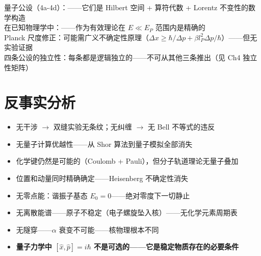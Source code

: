\precisionbox[R4 精度等级]
  量子公设（4a-4d）：\precexact ——它们是 Hilbert 空间 + 算符代数 + Lorentz 不变性的数学构造\\
  在已知物理学中：\preceffective ——作为有效理论在 $E \ll E_P$ 范围内是精确的\\
  Planck 尺度修正：可能需广义不确定性原理（$\Delta x \ge \hbar/\Delta p + \beta l_P^2 \Delta p/\hbar$）——但无实验证据\\
  四条公设的独立性：每条都是逻辑独立的——不可从其他三条推出（见 Ch4 独立性矩阵）
\endprecisionbox

\section*{反事实分析}

\begin{limitbox}
  \begin{itemize}
    \item 无干涉 $\to$ 双缝实验无条纹；无纠缠 $\to$ 无 Bell 不等式的违反
    \item 无量子计算优越性——从 Shor 算法到量子模拟全部消失
    \item 化学键仍然是可能的（Coulomb + Pauli），但分子轨道理论无量子叠加
  \end{itemize}
\end{limitbox}

\begin{limitbox}
  \begin{itemize}
    \item 位置和动量同时精确确定——Heisenberg 不确定性消失
    \item 无零点能：谐振子基态 $E_0 = 0$——绝对零度下一切静止
    \item 无离散能谱——原子不稳定（电子螺旋坠入核）——无化学元素周期表
    \item 无隧穿——$\alpha$ 衰变不可能——核物理根本不同
    \item \textbf{量子力学中 $[\hat{x},\hat{p}] = i\hbar$ 不是可选的——它是稳定物质存在的必要条件}
  \end{itemize}
\end{limitbox}
